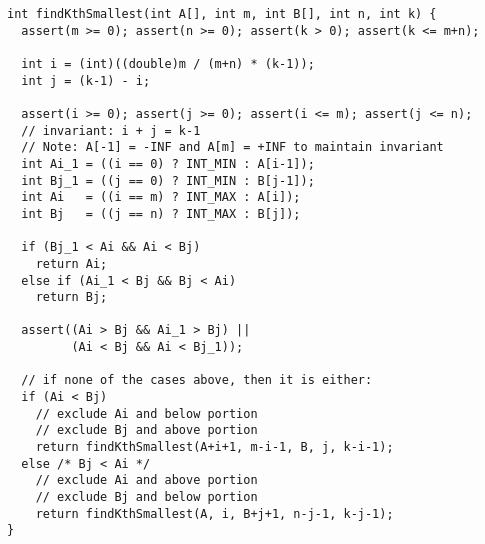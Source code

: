 \begin{verbatim}
int findKthSmallest(int A[], int m, int B[], int n, int k) {
  assert(m >= 0); assert(n >= 0); assert(k > 0); assert(k <= m+n);
  
  int i = (int)((double)m / (m+n) * (k-1));
  int j = (k-1) - i;
 
  assert(i >= 0); assert(j >= 0); assert(i <= m); assert(j <= n);
  // invariant: i + j = k-1
  // Note: A[-1] = -INF and A[m] = +INF to maintain invariant
  int Ai_1 = ((i == 0) ? INT_MIN : A[i-1]);
  int Bj_1 = ((j == 0) ? INT_MIN : B[j-1]);
  int Ai   = ((i == m) ? INT_MAX : A[i]);
  int Bj   = ((j == n) ? INT_MAX : B[j]);
 
  if (Bj_1 < Ai && Ai < Bj)
    return Ai;
  else if (Ai_1 < Bj && Bj < Ai)
    return Bj;
 
  assert((Ai > Bj && Ai_1 > Bj) || 
         (Ai < Bj && Ai < Bj_1));
 
  // if none of the cases above, then it is either:
  if (Ai < Bj)
    // exclude Ai and below portion
    // exclude Bj and above portion
    return findKthSmallest(A+i+1, m-i-1, B, j, k-i-1);
  else /* Bj < Ai */
    // exclude Ai and above portion
    // exclude Bj and below portion
    return findKthSmallest(A, i, B+j+1, n-j-1, k-j-1);
}
\end{verbatim}
